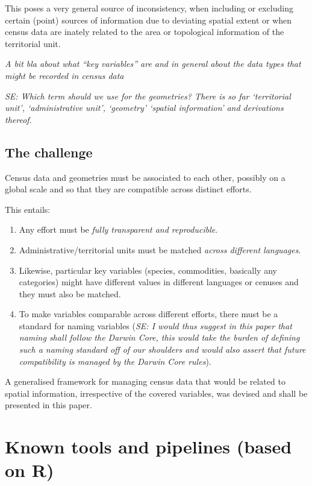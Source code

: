 \documentclass[12pt,]{article}
\providecommand{\tightlist}{%
  \setlength{\itemsep}{0pt}\setlength{\parskip}{0pt}}
\begin{document}
This poses a very general source of inconsistency, when including or excluding certain (point) sources of information due to deviating spatial extent or when census data are inately related to the area or topological information of the territorial unit.

\emph{A bit bla about what ``key variables'' are and in general about the data types that might be recorded in census data}

\emph{SE: Which term should we use for the geometries? There is so far `territorial unit', `administrative unit', `geometry' `spatial information' and derivations thereof.}

\hypertarget{the-challenge}{%
\subsection{The challenge}\label{the-challenge}}

Census data and geometries must be associated to each other, possibly on a global scale and so that they are compatible across distinct efforts.

This entails:

\begin{enumerate}
\def\labelenumi{\arabic{enumi}.}
\tightlist
\item
  Any effort must be \emph{fully transparent and reproducible}.
\item
  Administrative/territorial units must be matched \emph{across different languages}.
\item
  Likewise, particular key variables (species, commodities, basically any categories) might have different values in different languages or cenuses and they must also be matched.
\item
  To make variables comparable across different efforts, there must be a standard for naming variables (\emph{SE: I would thus suggest in this paper that naming shall follow the Darwin Core, this would take the burden of defining such a naming standard off of our shoulders and would also assert that future compatibility is managed by the Darwin Core rules}).
\end{enumerate}

A generalised framework for managing census data that would be related to spatial information, irrespective of the covered variables, was devised and shall be presented in this paper.

\hypertarget{known-tools-and-pipelines-based-on-r}{%
\section{Known tools and pipelines (based on R)}\label{known-tools-and-pipelines-based-on-r}}
\end{document}
